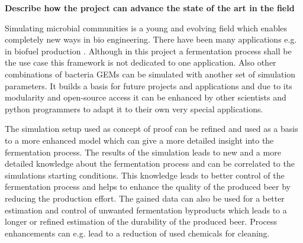 \noindent
\textbf{Describe how the project can advance the state of the art in the field}

Simulating microbial communities is a young and evolving field which enables completely new ways in bio engineering. There have been many 
applications e.g. in biofuel production \cite{hanly2011dynamic} \cite{chiu2014emergent}. Although in this project a fermentation process
shall be the use case this framework is not dedicated to one application. Also other combinations of bacteria GEMs can be simulated with
another set of simulation parameters. It builds a basis for future projects and applications and due to its modularity and open-source access
it can be enhanced by other scientists and python programmers to adapt it to their own very special applications.

The simulation setup used as concept of proof can be refined and used as a basis to a more enhanced model which can give a more detailed
insight into the fermentation process. The results of the simulation leads to new and a more detailed knowledge about the fermentation
process and can be correlated to the simulations starting conditions. This knowledge leads to better control of the fermentation process
and helps to enhance the quality of the produced beer by reducing the production effort. The gained data can also be used for a better
estimation and control of unwanted fermentation byproducts which leads to a longer or refined estimation of the durability of the produced
beer. Process enhancements can e.g. lead to a reduction of used chemicals for cleaning.


